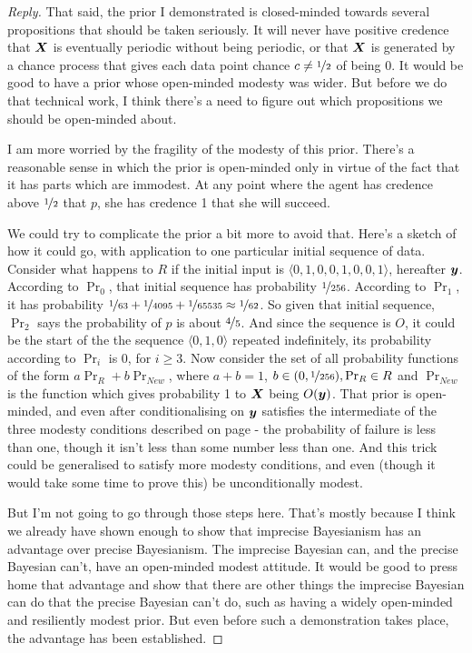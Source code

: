\begin{proof}[Reply]
That said, the prior I demonstrated is closed-minded towards several propositions that should be taken seriously. It will never have positive credence that $\boldsymbol{X}$ is eventually periodic without being periodic, or that $\boldsymbol{X}$ is generated by a chance process that gives each data point chance $c \neq \nicefrac{1}{2}$ of being 0. It would be good to have a prior whose open-minded modesty was wider. But before we do that technical work, I think there's a need to figure out which propositions we should be open-minded about.

I am more worried by the fragility of the modesty of this prior. There's a reasonable sense in which the prior is open-minded only in virtue of the fact that it has parts which are immodest. At any point where the agent has credence above $\nicefrac{1}{2}$ that $p$, she has credence 1 that she will succeed.

We could try to complicate the prior a bit more to avoid that. Here's a sketch of how it could go, with application to one particular initial sequence of data. Consider what happens to $R$ if the initial input is $\langle 0, 1, 0, 0, 1, 0, 0, 1\rangle$, hereafter $\boldsymbol{y}$. According to $\Pr_0$, that initial sequence has probability $\nicefrac{1}{256}$. According to $\Pr_1$, it has probability $\nicefrac{1}{63} + \nicefrac{1}{4095} + \nicefrac{1}{65535} \approx \nicefrac{1}{62}$. So given that initial sequence, $\Pr_2$ says the probability of $p$ is about $\nicefrac{4}{5}$. And since the sequence is $O$, it could be the start of the the sequence $\langle 0, 1, 0\rangle$ repeated indefinitely, its probability according to $\Pr_i$ is 0, for $i \geq 3$. Now consider the set of all probability functions of the form $a\Pr_{R} + b\Pr_{New}$, where $a + b = 1$, $b \in (0, \nicefrac{1}{256}), \Pr_{R} \in R$ and $\Pr_{New}$ is the function which gives probability 1 to $\boldsymbol{X}$ being $O(\boldsymbol{y})$. That prior is open-minded, and even after conditionalising on $\boldsymbol{y}$ satisfies the intermediate of the three modesty conditions described on page \pageref{ModestDef} - the probability of failure is less than one, though it isn't less than some number less than one. And this trick could be generalised to satisfy more modesty conditions, and even (though it would take some time to prove this) be unconditionally modest.

But I'm not going to go through those steps here. That's mostly because I think we already have shown enough to show that imprecise Bayesianism has an advantage over precise Bayesianism. The imprecise Bayesian can, and the precise Bayesian can't, have an open-minded modest attitude. It would be good to press home that advantage and show that there are other things the imprecise Bayesian can do that the precise Bayesian can't do, such as having a widely open-minded and resiliently modest prior. But even before such a demonstration takes place, the advantage has been established.
\end{proof}
